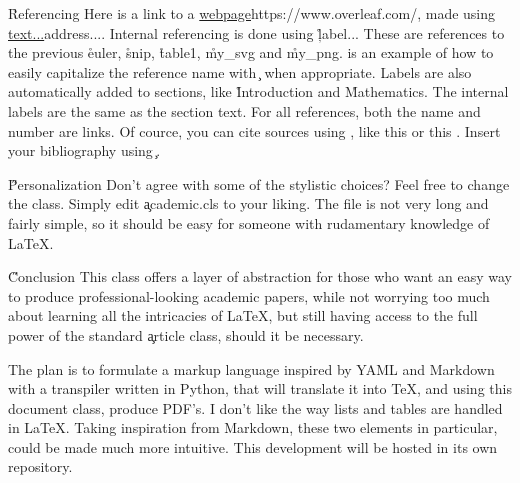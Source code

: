 \documentclass[twocolumn]{academic}
\begin{document}
\h{Referencing}
Here is a link to a \url{webpage}{https://www.overleaf.com/}, made using \c{\url{text...}{address...}}. Internal referencing is done using \c{\r{label...}} These are references to the previous \r{euler}, \r{snip}, \r{table1}, \r{my_svg} and \r{my_png}.  is an example of how to easily capitalize the reference name with \c{} when appropriate. Labels are also automatically added to sections, like \r{Introduction} and \r{Mathematics}. The internal labels are the same as the section text. For all references, both the name and number are links. Of cource, you can cite sources using \c{\cite{...}}, like this \cite{minted} or this \cite{tabularray}. Insert your bibliography using \c{}.

\H{Personalization}
Don't agree with some of the stylistic choices? Feel free to change the class. Simply edit \c{academic.cls} to your liking. The file is not very long and fairly simple, so it should be easy for someone with rudamentary knowledge of LaTeX.

\H{Conclusion}
This class offers a layer of abstraction for those who want an easy way to produce professional-looking academic papers, while not worrying too much about learning all the intricacies of LaTeX, but still having access to the full power of the standard \c{article} class, should it be necessary.

The plan is to formulate a markup language inspired by YAML and Markdown with a transpiler written in Python, that will translate it into TeX, and using this document class, produce PDF's. I don't like the way lists and tables are handled in LaTeX. Taking inspiration from Markdown, these two elements in particular, could be made much more intuitive. This development will be hosted in its own repository.
\end{document}
